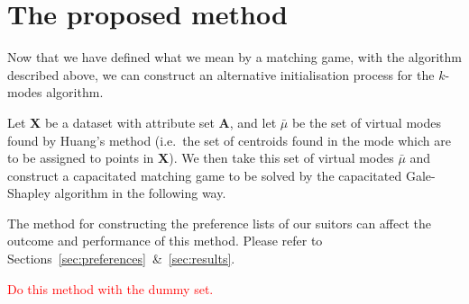 \section{The proposed method}\label{sec:proposed-method}

Now that we have defined what we mean by a matching game, with the algorithm 
described above, we can construct an alternative initialisation process for the 
\(k\)-modes algorithm.

Let \textbf{X} be a dataset with attribute set \textbf{A}, and let \(\bar{\mu}\) 
be the set of virtual modes found by Huang's method (i.e.\ the set of centroids 
found in the mode which are to be assigned to points in \textbf{X}). We then 
take this set of virtual modes \(\bar{\mu}\) and construct a capacitated 
matching game to be solved by the capacitated Gale-Shapley algorithm in the 
following way.

\begin{singlespace}
    
\end{singlespace}

\begin{remark}
    The method for constructing the preference lists of our suitors can affect
    the outcome and performance of this method. Please refer to
    Sections~\ref{sec:preferences}~\&~\ref{sec:results}.
\end{remark}

\begin{example}
    \textcolor{red}{Do this method with the dummy set.}
\end{example}
